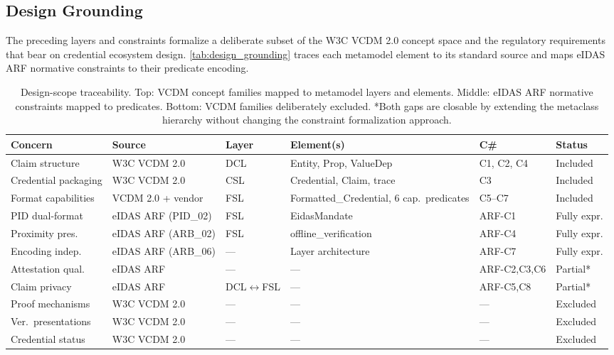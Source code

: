 \subsection{Design Grounding}\label{sec:design-grounding}

The preceding layers and constraints formalize a deliberate subset of the W3C VCDM 2.0 concept space and the regulatory requirements that bear on credential ecosystem design. \autoref{tab:design_grounding} traces each metamodel element to its standard source and maps eIDAS \ac{ARF} normative constraints to their predicate encoding.

\begin{table}[htb]
\caption{Design-scope traceability. Top: VCDM concept families mapped to metamodel layers and elements. Middle: eIDAS ARF normative constraints mapped to predicates. Bottom: VCDM families deliberately excluded. *Both gaps are closable by extending the metaclass hierarchy without changing the constraint formalization approach.
\label{tab:design_grounding}}
\small
\setlength{\tabcolsep}{3pt}
\begin{tabularx}{\columnwidth}{LLlLLL}
\toprule
Concern & Source & Layer & Element(s) & C\# & Status \\
\midrule
Claim structure & W3C VCDM 2.0 & DCL & Entity, Prop, ValueDep & C1, C2, C4 & Included \\
Credential packaging & W3C VCDM 2.0 & CSL & Credential, Claim, trace & C3 & Included \\
Format capabilities & VCDM 2.0 + vendor & FSL & Formatted\_Credential, 6 cap.\ predicates & C5--C7 & Included \\
\midrule
PID dual-format & eIDAS ARF (PID\_02) & FSL & EidasMandate & ARF-C1 & Fully expr. \\
Proximity pres. & eIDAS ARF (ARB\_02) & FSL & offline\_verification & ARF-C4 & Fully expr. \\
Encoding indep. & eIDAS ARF (ARB\_06) & --- & Layer architecture & ARF-C7 & Fully expr. \\
Attestation qual. & eIDAS ARF & --- & --- & ARF-C2,C3,C6 & Partial* \\
Claim privacy & eIDAS ARF & DCL$\leftrightarrow$FSL & --- & ARF-C5,C8 & Partial* \\
\midrule
Proof mechanisms & W3C VCDM 2.0 & --- & --- & --- & Excluded \\
Ver.\ presentations & W3C VCDM 2.0 & --- & --- & --- & Excluded \\
Credential status & W3C VCDM 2.0 & --- & --- & --- & Excluded \\
\bottomrule
\end{tabularx}
\end{table}

